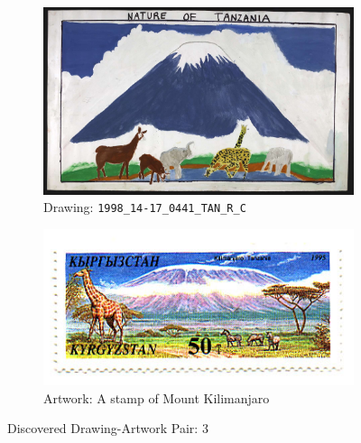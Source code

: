 \begin{figure}
     \centering
     \begin{subfigure}[b]{0.45\textwidth}
         \centering
         \includegraphics[width=\textwidth]{images/new_discoveries/1998_14-17_0441_TAN_R_C.jpg}
         \caption{Drawing: \texttt{1998\_14-17\_0441\_TAN\_R\_C}}
         \label{fig:1998_14-17_0441_TAN_R_C}
     \end{subfigure}
     \hfill
     \begin{subfigure}[b]{0.45\textwidth}
         \centering
         \includegraphics[width=\textwidth]{images/new_discoveries/kyrgyzstan_stamp_of_kilimanjaro.jpg}
         \caption{Artwork: A stamp of Mount Kilimanjaro}
         \label{fig:kyrgyzstan_stamp_of_kilimanjaro}
     \end{subfigure}
     \caption{Discovered Drawing-Artwork Pair: 3}
\end{figure}


